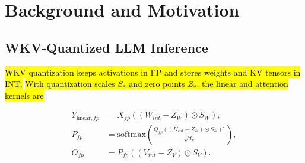 \documentclass[sigconf,anonymous,nonacm]{acmart}
\newcommand{\fpint}{FP-INT}
\newcommand{\wkv}{WKV}
\newcommand{\Cfou}{FINISH}
\DeclareRobustCommand{\rev}[1]{\hl{#1}}
\begin{document}

\section{Background and Motivation}
\subsection{WKV-Quantized LLM Inference}

\rev{\wkv{} quantization keeps activations in FP and stores weights and KV tensors in INT.} \rev{With quantization scales $S_*$ and zero points $Z_*$, the linear and attention kernels are}

\begin{align}
    Y_{\mathrm{linear},fp}
    &=
    X_{fp}
    \left(
        \left(
            W_{int}
            -
            Z_W
        \right)
        \odot
        S_W
    \right),
    \\
    P_{fp}
    &=
    \mathrm{softmax}
    \left(
        \frac{
            Q_{fp}
            \left(
                \left(
                    K_{int}
                    -
                    Z_K
                \right)
                \odot
                S_K
            \right)^T
        }{
            \sqrt{d_k}
        }
    \right),
    \\
    O_{fp}
    &=
    P_{fp}
    \left(
        \left(
            V_{int}
            -
            Z_V
        \right)
        \odot
        S_V
    \right).
\end{align}
\end{document}
